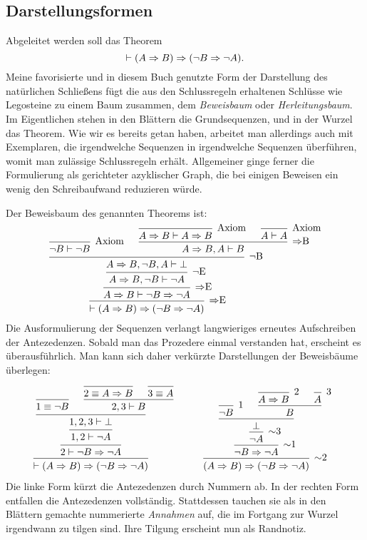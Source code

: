 \subsection{Darstellungsformen}

Abgeleitet werden soll das Theorem
\[\vdash (A\Rightarrow B)\Rightarrow (\lnot B\Rightarrow\lnot A).\]
Meine favorisierte und in diesem Buch genutzte Form der Darstellung
des natürlichen Schließens fügt die aus den Schlussregeln erhaltenen
Schlüsse wie Legosteine zu einem Baum zusammen, dem
\emph{Beweisbaum} oder \emph{Herleitungsbaum}.
Im Eigentlichen stehen in den Blättern die Grundsequenzen, und in der
Wurzel das Theorem. Wie wir es bereits getan haben, arbeitet man
allerdings auch mit Exemplaren, die irgendwelche Sequenzen in
irgendwelche Sequenzen überführen, womit man zulässige Schlussregeln
erhält. Allgemeiner ginge ferner die Formulierung als gerichteter
azyklischer Graph, die bei einigen Beweisen ein wenig den
Schreibaufwand reduzieren würde.

Der Beweisbaum des genannten Theorems ist:
\[\begin{prooftree}
        \infer0[Axiom]{\lnot B\vdash\lnot B}
          \infer0[Axiom]{A\cond B\vdash A\cond B}
          \infer0[Axiom]{A\vdash A}
        \infer2[$\cond$B]{A\cond B, A\vdash B}
      \infer2[$\lnot$B]{A\cond B, \lnot B, A\vdash\bot}
    \infer1[$\lnot$E]{A\cond B, \lnot B\vdash\lnot A}
  \infer1[$\cond$E]{A\cond B\vdash \lnot B\cond\lnot A}
\infer1[$\cond$E]{\vdash (A\cond B)\cond (\lnot B\cond\lnot A)}
\end{prooftree}\]
Die Ausformulierung der Sequenzen verlangt langwieriges erneutes
Aufschreiben der Antezedenzen. Sobald man das Prozedere einmal
verstanden hat, erscheint es überausführlich. Man kann sich daher
verkürzte Darstellungen der Beweisbäume überlegen:
\[\begin{array}{@{}l@{\qquad\quad}l}
\begin{prooftree}[center=false]
        \infer0{1\equiv\lnot B}
          \infer0{2\equiv A\cond B}
          \infer0{3\equiv A}
        \infer2{2, 3\vdash B}
      \infer2{1, 2, 3\vdash\bot}
    \infer1{1, 2\vdash\lnot A}
  \infer1{2\vdash \lnot B\cond\lnot A}
\infer1{\vdash (A\cond B)\cond (\lnot B\cond\lnot A)}
\end{prooftree}
&
\begin{prooftree}[center=false]
        \infer0[1]{\lnot B}
          \infer0[2]{A\cond B}
          \infer0[3]{A}
        \infer2{B}
      \infer2{\bot}
    \infer1[$\sim$3]{\lnot A}
  \infer1[$\sim$1]{\lnot B\cond\lnot A}
\infer1[$\sim$2]{(A\cond B)\cond (\lnot B\cond\lnot A)}
\end{prooftree}
\end{array}\]
Die linke Form kürzt die Antezedenzen durch Nummern ab. In der rechten
Form entfallen die Antezedenzen vollständig. Stattdessen tauchen sie
als in den Blättern gemachte nummerierte \emph{Annahmen} auf, die im
Fortgang zur Wurzel irgendwann zu tilgen sind. Ihre Tilgung erscheint
nun als Randnotiz.

